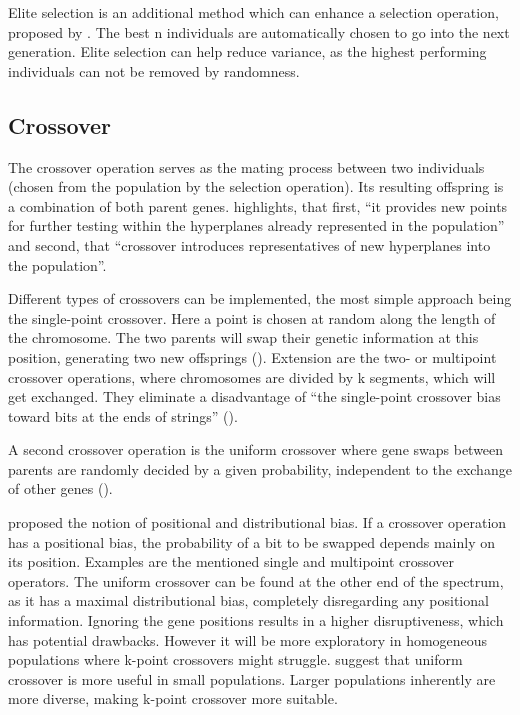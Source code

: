 Elite selection is an additional method which can enhance a selection operation, proposed by \cite{de_jong_analysis_1975}. The best n individuals are automatically chosen to go into the next generation. Elite selection can help reduce variance, as the highest performing individuals can not be removed by randomness.

\subsection{Crossover}
The crossover operation serves as the mating process between two individuals (chosen from the population by the selection operation). Its resulting offspring is a combination of both parent genes. \cite{grefenstette_optimization_1986} highlights, that first, \enquote{it provides new points for further testing within the hyperplanes already represented in the population} and second, that \enquote{crossover introduces representatives of new hyperplanes into the population}. 

Different types of crossovers can be implemented, the most simple approach being the single-point crossover. Here a point is chosen at random along the length of the chromosome. The two parents will swap their genetic information at this position, generating two new offsprings (\cite{katoch_review_2021}). Extension are the two- or multipoint crossover operations, where chromosomes are divided by k segments, which will get exchanged. They eliminate a disadvantage of \enquote{the single-point crossover bias toward bits at the ends of strings} (\cite{srinivas_genetic_1994}).

A second crossover operation is the uniform crossover where gene swaps between parents are randomly decided by a given probability, independent to the exchange of other genes (\cite{katoch_review_2021}). 

\cite{srinivas_genetic_1994} proposed the notion of positional and distributional bias. If a crossover operation has a positional bias, the probability of a bit to be swapped depends mainly on its position. Examples are the mentioned single and multipoint crossover operators. The uniform crossover can be found at the other end of the spectrum, as it has a maximal distributional bias, completely disregarding any positional information. Ignoring the gene positions results in a higher disruptiveness, which has potential drawbacks. However it will be more exploratory in homogeneous populations where k-point crossovers might struggle. \cite{srinivas_genetic_1994} suggest that uniform crossover is more useful in small populations. Larger populations inherently are more diverse, making k-point crossover more suitable.

